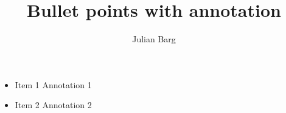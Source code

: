 \documentclass{article}
\title{Bullet points with annotation}
\author{Julian Barg}
\begin{document}
	\maketitle

	\begin{paracol}{2}
	\begin{itemize}
		\item Item 1
		\switchcolumn
		Annotation 1
		\switchcolumn*

		\item Item 2
		\switchcolumn
		Annotation 2
		\switchcolumn*

	\end{itemize}
	\end{paracol}
\end{document}
